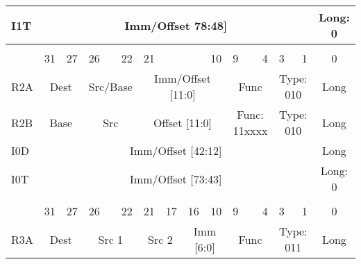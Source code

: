 \documentclass{article}
\begin{document}
\begin{table}[H]
\begin{tabular}{|l|l|r|l|r|l|r|l|r|l|r|l|r|l|r|c|}
    \hline I1T  &   \multicolumn{14}{|c|}{Imm/Offset 78:48]}    &   Long: 0 \\
    
    \hline          \multicolumn{16}{c}{} \\
    
    
    \hline      &   \multicolumn{1}{l}{31}  &   27      &   \multicolumn{1}{l}{26}  &   22  &   \multicolumn{5}{l}{21}  &   10          &   \multicolumn{1}{l}{9}   &   4   &   \multicolumn{1}{l}{3}   &   1   &   0 \\
    \hline R2A  &   \multicolumn{2}{|c|}{Dest}          &   \multicolumn{2}{|c|}{Src/Base}  &   \multicolumn{6}{|c|}{Imm/Offset [11:0]} &   \multicolumn{2}{|c|}{Func}      &   \multicolumn{2}{|c|}{Type: 010} &   Long \\
    
    \hline R2B  &   \multicolumn{2}{|c|}{Base}          &   \multicolumn{2}{|c|}{Src}       &   \multicolumn{6}{|c|}{Offset [11:0]} &   \multicolumn{2}{|c|}{Func: 11xxxx}      &   \multicolumn{2}{|c|}{Type: 010} &   Long \\
    
    \hline I0D  &   \multicolumn{14}{|c|}{Imm/Offset [42:12]}   &   Long \\
    
    \hline I0T  &   \multicolumn{14}{|c|}{Imm/Offset [73:43]}   &   Long: 0 \\
    
    \hline          \multicolumn{16}{c}{} \\
    
    
    \hline      &   \multicolumn{1}{l}{31}  &   27      &   \multicolumn{1}{l}{26}  &   22  &   \multicolumn{1}{l}{21}  &   17      &   \multicolumn{3}{l}{16}  &   10      &   \multicolumn{1}{l}{9}   &   4   &   \multicolumn{1}{l}{3}   &   1   &   0 \\
    \hline R3A  &   \multicolumn{2}{|c|}{Dest}          &   \multicolumn{2}{|c|}{Src 1}     &   \multicolumn{2}{|c|}{Src 2}         &   \multicolumn{4}{|c|}{Imm [6:0]}     &   \multicolumn{2}{|c|}{Func}      &   \multicolumn{2}{|c|}{Type: 011} &   Long \\
    

\end{tabular}
\end{table}
\end{document}
